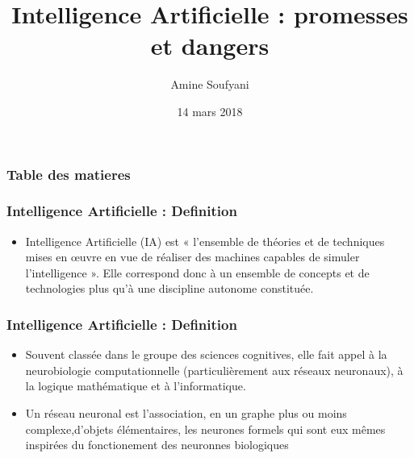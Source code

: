\documentclass{beamer}
\title{Intelligence Artificielle : promesses et dangers}
\author{Amine Soufyani}
\date{14 mars 2018}
\begin{document}
	\begin{frame}
	\titlepage
	\end{frame}
	
	\begin{frame} %
	\frametitle{Table des matieres}
	\tableofcontents[hideallsubsections] %
	\end{frame}

	
	\begin{frame}[fragile]
	\frametitle{Intelligence Artificielle : Definition}
	\begin{itemize}
		\item Intelligence Artificielle (IA)
		  est « l'ensemble de théories et de techniques mises en œuvre en vue de réaliser des machines     					  capables de simuler l'intelligence ». Elle correspond donc à un ensemble 	de concepts et de 						  technologies plus qu'à une discipline autonome constituée.
	\end{itemize}
	\end{frame}
	
	\begin{frame}[fragile]
	\frametitle{Intelligence Artificielle : Definition}
	\begin{itemize}
		\itemsep2em
		\item Souvent classée dans le groupe des sciences cognitives, elle fait appel à la neurobiologie 					computationnelle (particulièrement aux réseaux neuronaux), à la logique mathématique et à 							l'informatique. 
		
		\item Un réseau neuronal est l’association, en un graphe plus ou moins 															complexe,d’objets élémentaires, les neurones formels qui sont eux mêmes inspirées du fonctionement 		des neuronnes biologiques
	\end{itemize}
	\end{frame}
	
	
\end{document}
